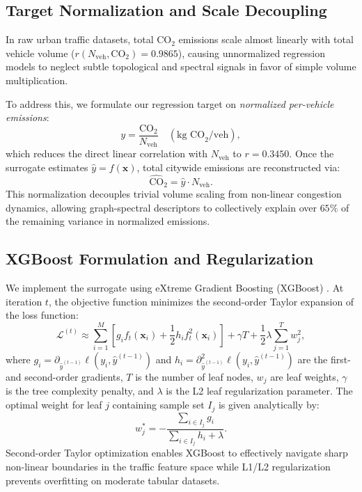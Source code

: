 \documentclass[journal]{IEEEtran}
\begin{document}
\subsection{Target Normalization and Scale Decoupling}
In raw urban traffic datasets, total $\text{CO}_2$ emissions scale almost linearly with total vehicle volume ($r(N_{\text{veh}}, \text{CO}_2) = 0.9865$), causing unnormalized regression models to neglect subtle topological and spectral signals in favor of simple volume multiplication.

To address this, we formulate our regression target on \emph{normalized per-vehicle emissions}:
\begin{equation}
y = \frac{\text{CO}_2}{N_{\text{veh}}} \quad (\text{kg CO}_2 / \text{veh}),
\label{eq:target_normalization}
\end{equation}
which reduces the direct linear correlation with $N_{\text{veh}}$ to $r = 0.3450$. Once the surrogate estimates $\hat{y} = f(\mathbf{x})$, total citywide emissions are reconstructed via:
\begin{equation}
\widehat{\text{CO}}_2 = \hat{y} \cdot N_{\text{veh}}.
\label{eq:target_reconstruction}
\end{equation}
This normalization decouples trivial volume scaling from non-linear congestion dynamics, allowing graph-spectral descriptors to collectively explain over $65\%$ of the remaining variance in normalized emissions.

\subsection{XGBoost Formulation and Regularization}
We implement the surrogate using eXtreme Gradient Boosting (XGBoost) \cite{Chen2016}. At iteration $t$, the objective function minimizes the second-order Taylor expansion of the loss function:
\begin{equation}
\mathcal{L}^{(t)} \approx \sum_{i=1}^{M} \left[ g_i f_t(\mathbf{x}_i) + \frac{1}{2} h_i f_t^2(\mathbf{x}_i) \right] + \gamma T + \frac{1}{2} \lambda \sum_{j=1}^T w_j^2,
\label{eq:xgboost_obj}
\end{equation}
where $g_i = \partial_{\hat{y}^{(t-1)}} \ell(y_i, \hat{y}^{(t-1)})$ and $h_i = \partial_{\hat{y}^{(t-1)}}^2 \ell(y_i, \hat{y}^{(t-1)})$ are the first- and second-order gradients, $T$ is the number of leaf nodes, $w_j$ are leaf weights, $\gamma$ is the tree complexity penalty, and $\lambda$ is the L2 leaf regularization parameter. The optimal weight for leaf $j$ containing sample set $I_j$ is given analytically by:
\begin{equation}
w_j^* = - \frac{\sum_{i \in I_j} g_i}{\sum_{i \in I_j} h_i + \lambda}.
\label{eq:xgboost_weights}
\end{equation}
Second-order Taylor optimization enables XGBoost to effectively navigate sharp non-linear boundaries in the traffic feature space while L1/L2 regularization prevents overfitting on moderate tabular datasets.
\end{document}
